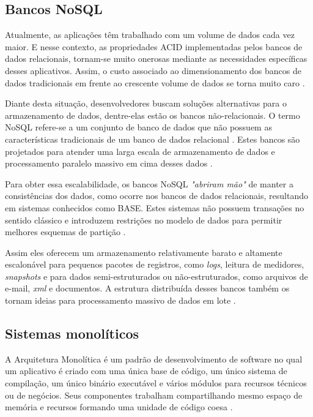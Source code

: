 \subsection{Bancos NoSQL}

Atualmente, as aplicações têm trabalhado com um volume de dados cada vez maior.
E nesse contexto, as propriedades \gls{ACID} implementadas pelos bancos de dados relacionais,
tornam-se muito onerosas mediante as necessidades específicas desses aplicativos.
Assim, o custo associado ao dimensionamento dos bancos de dados tradicionais em
frente ao crescente volume de dados se torna muito caro \cite{Gajendran}.

Diante desta situação, desenvolvedores buscam soluções alternativas para o
armazenamento de dados, dentre-elas estão os bancos não-relacionais. O termo
\gls{NoSQL} refere-se a um conjunto de banco de dados que não possuem as características
tradicionais de um banco de dados relacional \cite{Gajendran}. Estes bancos são projetados
para atender uma larga escala de armazenamento de dados e processamento paralelo
massivo em cima desses dados \cite{NewEraOfDatabases}.

Para obter essa escalabilidade, os bancos \gls{NoSQL} \textit{"abriram mão"} de
manter a consistências dos dados, como ocorre nos bancos de dados relacionais,
resultando em sistemas conhecidos como \gls{BASE}. Estes sistemas não possuem
transações no sentido clássico e introduzem restrições no modelo de dados
para permitir melhores esquemas de partição .

Assim eles oferecem um armazenamento relativamente barato e altamente escalonável
para pequenos pacotes de registros, como \textit{logs}, leitura de medidores,
\textit{snapshots} e para dados semi-estruturados ou não-estruturados, como arquivos
de e-mail, \textit{xml} e documentos. A estrutura distribuída desses bancos também
os tornam ideias para processamento massivo de dados em lote \cite{NewEraOfDatabases}.

\subsection{Sistemas monolíticos}

A Arquitetura Monolítica é um padrão de desenvolvimento de software no qual um aplicativo
é criado com uma única base de código, um único sistema de compilação, um único binário
executável e vários módulos para recursos técnicos ou de negócios. Seus componentes
trabalham compartilhando mesmo espaço de memória e recursos formando uma unidade de
código coesa \cite{NatalliaSakovich}.

